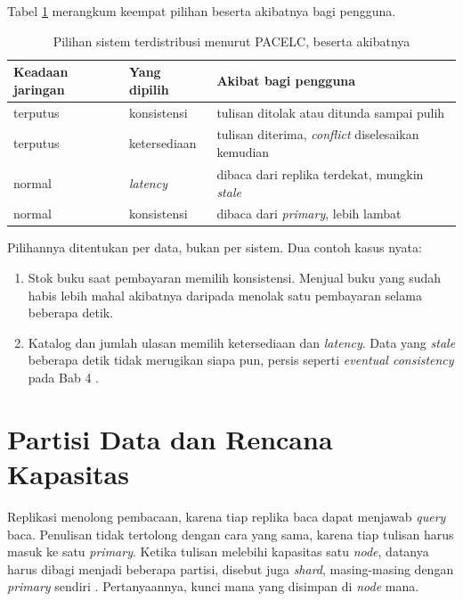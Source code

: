Tabel \ref{tab:cap14} merangkum keempat pilihan beserta akibatnya bagi
pengguna.

\begin{table}[!htb]
  \centering
  \caption{Pilihan sistem terdistribusi menurut PACELC, beserta akibatnya}
  \label{tab:cap14}
  \begin{tabularx}{\textwidth}{llX}
    \hline
    \textbf{Keadaan jaringan} & \textbf{Yang dipilih} & \textbf{Akibat bagi pengguna} \\
    \hline
    terputus & konsistensi & tulisan ditolak atau ditunda sampai pulih \\
    \hline
    terputus & ketersediaan & tulisan diterima, \textit{conflict} diselesaikan kemudian \\
    \hline
    normal & \textit{latency} & dibaca dari replika terdekat, mungkin \textit{stale} \\
    \hline
    normal & konsistensi & dibaca dari \textit{primary}, lebih lambat \\
    \hline
  \end{tabularx}
\end{table}

Pilihannya ditentukan per data, bukan per sistem. Dua contoh kasus nyata:
\begin{enumerate}
  \item Stok buku saat pembayaran memilih konsistensi. Menjual buku yang
        sudah habis lebih mahal akibatnya daripada menolak satu pembayaran
        selama beberapa detik.
  \item Katalog dan jumlah ulasan memilih ketersediaan dan \textit{latency}.
        Data yang \textit{stale} beberapa detik tidak merugikan siapa pun,
        persis seperti \textit{eventual consistency} pada Bab 4
        \cite{vogels2009eventually}.
\end{enumerate}

\section{Partisi Data dan Rencana Kapasitas}

Replikasi menolong pembacaan, karena tiap replika baca dapat menjawab
\textit{query} baca. Penulisan tidak tertolong dengan cara yang sama, karena
tiap tulisan harus masuk ke satu \textit{primary}. Ketika tulisan melebihi kapasitas
satu \textit{node}, datanya harus dibagi menjadi beberapa partisi, disebut juga
\textit{shard}, masing-masing dengan \textit{primary} sendiri \cite{kleppmann2017ddia}.
Pertanyaannya, kunci mana yang disimpan di \textit{node} mana.

